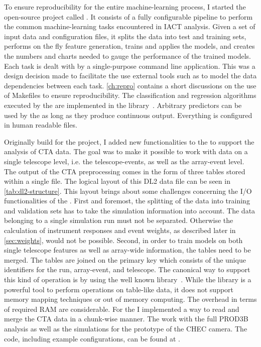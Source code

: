 To ensure reproducibility for the entire machine-learning process, 
I started the open-source \python project called \aicttools. It consists of a fully configurable pipeline 
to perform the common machine-learning tasks encountered in IACT analysis. 
Given a set of input data and configuration files, it splits the data into test and training sets,
performs on the fly feature generation, trains and applies the models, and creates the numbers and charts needed to gauge the
performance of the trained models.
Each task is dealt with by a single-purpose command line application. This was a design decision made to facilitate 
the use external tools such as \make to model the data dependencies between each task.
\cref{ch:repro} contains a short discussions on the use of Makefiles to ensure reproducibility.
The classification and regression algorithms executed by the \aicttools are implemented in the \sklearn library~\cite{sklearn}.
Arbitrary \sklearn predictors can be used by the \aicttools as long as they produce continuous output. 
Everything is configured in human readable \yaml files. 

Originally build for the \fact project, I added new functionalities to the \aicttools to support the analysis of CTA data.
The goal was to make it possible to work with data on a single telescope level, i.e. the telescope-events, as well as the array-event level.
The output of the CTA preprocessing comes in the form of three tables stored within a single \hdf file.
The logical layout of this DL2 data file can be seen in \cref{tab:dl2-structure}.
This layout brings about some challenges concerning the I/O functionalities of the \aicttools.
First and foremost, the splitting of the data into training and validation sets has to take the simulation information into account.
The data belonging to a single simulation run must not be separated. 
 Otherwise the calculation of instrument responses and event weights, 
as described later in \cref{sec:weights}, would not be possible. 
Second, in order to train models on both single telescope features as well as array-wide information, the tables need to be merged. 
The tables are joined on the primary key which consists of the unique identifiers for the run, array-event, and telescope.
The canonical way to support this kind of operation is by using the well known \pandas library~\cite{pandas}.
While the library is a powerful tool to perform operations on table-like data, it does not support memory mapping techniques or out of memory computing.
The overhead in terms of required RAM are considerable.
For the \aicttools I implemented a way to read and merge the CTA data in a chunk-wise manner.
The \aicttools work with the full PROD3B analysis as well as the simulations for the prototype
of the CHEC camera. 
The code, including example configurations, can be found at 
. 

